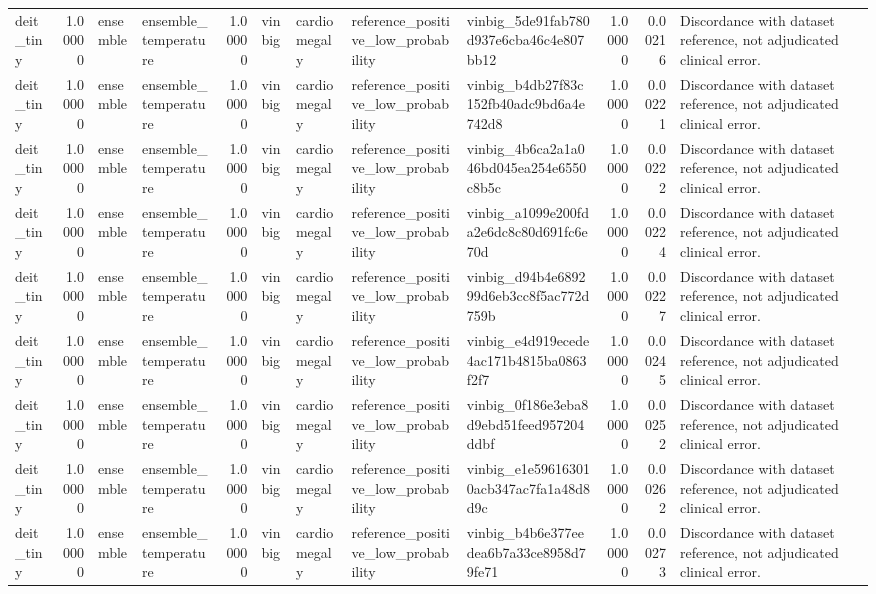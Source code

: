 \begin{tabular}{lrllrllllrrl}
deit\_tiny & 1.00000 & ensemble & ensemble\_temperature & 1.00000 & vinbig & cardiomegaly & reference\_positive\_low\_probability & vinbig\_5de91fab780d937e6cba46c4e807bb12 & 1.00000 & 0.00216 & Discordance with dataset reference, not adjudicated clinical error. \\
deit\_tiny & 1.00000 & ensemble & ensemble\_temperature & 1.00000 & vinbig & cardiomegaly & reference\_positive\_low\_probability & vinbig\_b4db27f83c152fb40adc9bd6a4e742d8 & 1.00000 & 0.00221 & Discordance with dataset reference, not adjudicated clinical error. \\
deit\_tiny & 1.00000 & ensemble & ensemble\_temperature & 1.00000 & vinbig & cardiomegaly & reference\_positive\_low\_probability & vinbig\_4b6ca2a1a046bd045ea254e6550c8b5c & 1.00000 & 0.00222 & Discordance with dataset reference, not adjudicated clinical error. \\
deit\_tiny & 1.00000 & ensemble & ensemble\_temperature & 1.00000 & vinbig & cardiomegaly & reference\_positive\_low\_probability & vinbig\_a1099e200fda2e6dc8c80d691fc6e70d & 1.00000 & 0.00224 & Discordance with dataset reference, not adjudicated clinical error. \\
deit\_tiny & 1.00000 & ensemble & ensemble\_temperature & 1.00000 & vinbig & cardiomegaly & reference\_positive\_low\_probability & vinbig\_d94b4e689299d6eb3cc8f5ac772d759b & 1.00000 & 0.00227 & Discordance with dataset reference, not adjudicated clinical error. \\
deit\_tiny & 1.00000 & ensemble & ensemble\_temperature & 1.00000 & vinbig & cardiomegaly & reference\_positive\_low\_probability & vinbig\_e4d919ecede4ac171b4815ba0863f2f7 & 1.00000 & 0.00245 & Discordance with dataset reference, not adjudicated clinical error. \\
deit\_tiny & 1.00000 & ensemble & ensemble\_temperature & 1.00000 & vinbig & cardiomegaly & reference\_positive\_low\_probability & vinbig\_0f186e3eba8d9ebd51feed957204ddbf & 1.00000 & 0.00252 & Discordance with dataset reference, not adjudicated clinical error. \\
deit\_tiny & 1.00000 & ensemble & ensemble\_temperature & 1.00000 & vinbig & cardiomegaly & reference\_positive\_low\_probability & vinbig\_e1e596163010acb347ac7fa1a48d8d9c & 1.00000 & 0.00262 & Discordance with dataset reference, not adjudicated clinical error. \\
deit\_tiny & 1.00000 & ensemble & ensemble\_temperature & 1.00000 & vinbig & cardiomegaly & reference\_positive\_low\_probability & vinbig\_b4b6e377eedea6b7a33ce8958d79fe71 & 1.00000 & 0.00273 & Discordance with dataset reference, not adjudicated clinical error. \\

\end{tabular}
